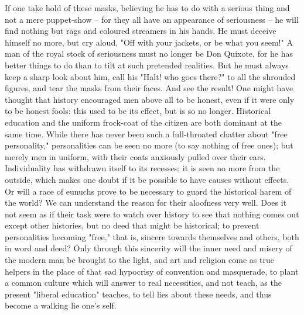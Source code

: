 If one take hold of these masks, believing he has to do with a
serious thing and not a mere puppet-show -- for they all have an
appearance of seriousness -- he will find nothing but rags and coloured
streamers in his hands. He must deceive himself no more, but cry
aloud, "Off with your jackets, or be what you seem!" A man of the
royal stock of seriousness must no longer be Don Quixote, for he has
better things to do than to tilt at such pretended realities. But he
must always keep a sharp look about him, call his "Halt! who goes
there?" to all the shrouded figures, and tear the masks from their
faces. And see the result! One might have thought that history
encouraged men above all to be honest, even if it were only to be
honest fools: this used to be its effect, but is so no longer.
Historical education and the uniform frock-coat of the citizen are
both dominant at the same time. While there has never been such a
full-throated chatter about "free personality," personalities can be
seen no more (to say nothing of free ones); but merely men in
uniform, with their coats anxiously pulled over their ears.
Individuality has withdrawn itself to its recesses; it is seen no
more from the outside, which makes one doubt if it be possible to
have causes without effects. Or will a race of eunuchs prove to be
necessary to guard the historical harem of the world? We can
understand the reason for their aloofness very well. Does it not seem
as if their task were to watch over history to see that nothing comes
out except other histories, but no deed that might be historical; to
prevent personalities becoming "free," that is, sincere towards
themselves and others, both in word and deed? Only through this
sincerity will the inner need and misery of the modern man be brought
to the light, and art and religion come as true helpers in the place
of that sad hypocrisy of convention and masquerade, to plant a common
culture which will answer to real necessities, and not teach, as the
present "liberal education" teaches, to tell lies about these needs,
and thus become a walking lie one's self.


